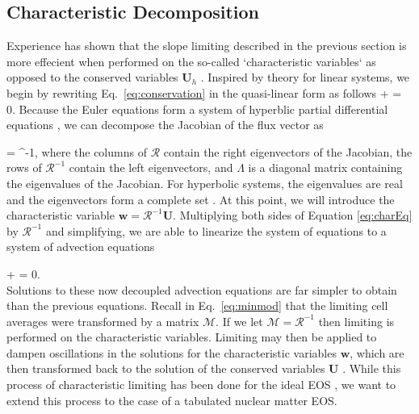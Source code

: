 \documentclass[onecolumn]{aastex62}
\begin{document}
\subsection{Characteristic Decomposition}
\label{sec:characteristicDecomp}
Experience has shown that the slope limiting described in the previous section
is more effecient when performed on the so-called `characteristic variables`
as opposed to the conserved variables $\mathbf{U}_h$
\citep[see, e.g.,][for a description]{cockburn:1998}.
Inspired by theory for linear systems, we begin by
rewriting Eq.~\eqref{eq:conservation} in the quasi-linear form as follows
\beq
  + 
  = 0.
  \label{eq:charEq}
\eeq
Because the Euler equations form a system of hyperblic
partial differential equations \citep[see, e.g.,][]{leveque:1992}, we can decompose the
Jacobian of the flux vector as

\beq
   =
   \Lambda {}^{-1},
\eeq
where the columns of $\mathcal{R}$ contain the right eigenvectors of the Jacobian,
the rows of $\mathcal{R}^{-1}$ contain the left eigenvectors, and
$\Lambda$ is a diagonal matrix containing the eigenvalues of the Jacobian.
For hyperbolic systems, the eigenvalues are real and the eigenvectors form a
complete set \citep[see e.g.,][]{leveque:1992}.
At this point, we will introduce the characteristic variable
$\mathbf{w} = \mathcal{R}^{-1}\mathbf{U}$. Multiplying both sides of Equation
\eqref{eq:charEq} by $\mathcal{R}^{-1}$ and simplifying, we are able to linearize the system of equations to
a system of advection equations

\beq
   +
  \Lambda {}
  = 0. \\
\eeq
Solutions to these now decoupled advection equations are far simpler to obtain than the
previous equations. Recall in Eq.~\eqref{eq:minmod} that the limiting cell
averages were transformed by a matrix $\mathcal{M}$. If we let
$\mathcal{M}=\mathcal{R}^{-1}$ then limiting is performed on the characteristic variables.
Limiting may then be applied to dampen oscillations in the
solutions for the characteristic variables $\mathbf{w}$, which are then
transformed back to the solution of the conserved variables $\mathbf{U}$
\citep[see e.g.,][for a description]{cockburn:1998, schaal:2015a}.
While this
process of characteristic limiting has been done for the ideal EOS
\citep[][]{cockburn:1998}, we want to extend this process to the case of a
tabulated nuclear matter EOS.
\end{document}
